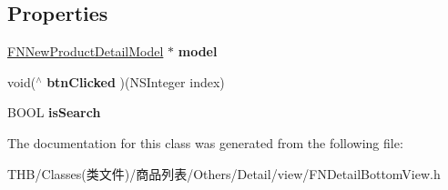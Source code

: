 \subsection*{Properties}
\begin{DoxyCompactItemize}
\item 
\mbox{\label{interface_f_n_detail_bottom_view_a65cedc2a50cc4cf639c062135b794377}} 
\mbox{\hyperlink{interface_f_n_new_product_detail_model}{F\+N\+New\+Product\+Detail\+Model}} $\ast$ {\bfseries model}
\item 
\mbox{\label{interface_f_n_detail_bottom_view_a95493832bdc0bcfbe4b9d3226ad921e0}} 
void($^\wedge$ {\bfseries btn\+Clicked} )(N\+S\+Integer index)
\item 
\mbox{\label{interface_f_n_detail_bottom_view_a0a478d27e3b4e09c160348a221d25ec9}} 
B\+O\+OL {\bfseries is\+Search}
\end{DoxyCompactItemize}


The documentation for this class was generated from the following file\+:\begin{DoxyCompactItemize}
\item 
T\+H\+B/\+Classes(类文件)/商品列表/\+Others/\+Detail/view/F\+N\+Detail\+Bottom\+View.\+h\end{DoxyCompactItemize}
